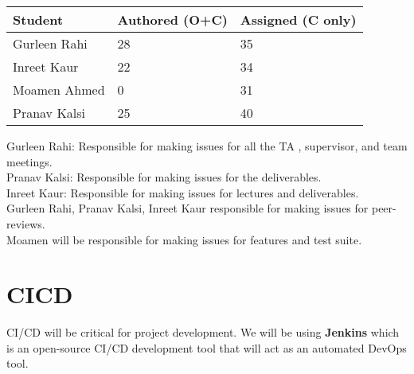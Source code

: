 \documentclass{article}
\begin{document}

\begin{table}[H]
\centering
\begin{tabular}{lll}
\toprule
\textbf{Student} & \textbf{Authored (O+C)} & \textbf{Assigned (C only)}\\
\midrule
Gurleen Rahi & 28 & 35\\
Inreet Kaur & 22 & 34\\
Moamen Ahmed & 0 & 31\\
Pranav Kalsi & 25 & 40\\
\bottomrule
\end{tabular}
\end{table}

Gurleen Rahi: Responsible for making issues for all the TA , supervisor,  and team meetings.\\
Pranav Kalsi: Responsible for making issues for the deliverables.\\
Inreet Kaur: Responsible for making issues for lectures and deliverables. \\
Gurleen Rahi, Pranav Kalsi, Inreet Kaur responsible for making issues for peer-reviews.\\
Moamen will be responsible for making issues for features and test suite.\\



\section{CICD}



CI/CD will be critical for project development. We will be using \textbf{Jenkins} which is an open-source CI/CD development tool that will act as an automated DevOps tool.
\end{document}
